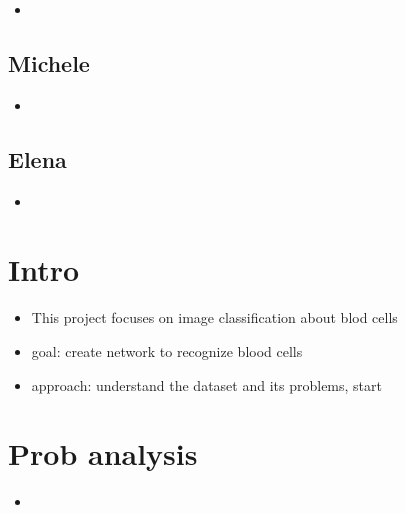 \documentclass[11pt]{article}
\begin{document}
\begin{multicols*}{2}
        \begin{itemize}
            \item 
        \end{itemize}

        \subsection{Michele}

        \begin{itemize}
            \item 
        \end{itemize}

        \subsection{Elena}

        \begin{itemize}
            \item 
        \end{itemize}

        
        
    
    \end{multicols*}

    \newpage

    \section{Intro}

    \begin{itemize}
        \item This project focuses on image classification about blod cells
        \item goal: create network to recognize blood cells
        \item approach: understand the dataset and its problems, start
    \end{itemize}

    \section{Prob analysis} 

    \begin{itemize}
        \item 
    \end{itemize}
\end{document}
